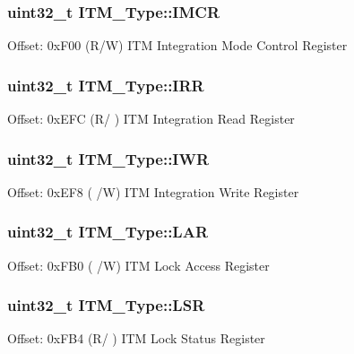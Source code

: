 \subsubsection[{\texorpdfstring{I\+M\+CR}{IMCR}}]{ uint32\+\_\+t I\+T\+M\+\_\+\+Type\+::\+I\+M\+CR}\hypertarget{structITM__Type_ab2e87d8bb0e3ce9b8e0e4a6a6695228a}{}\label{structITM__Type_ab2e87d8bb0e3ce9b8e0e4a6a6695228a}
Offset\+: 0x\+F00 (R/W) I\+TM Integration Mode Control Register 
\subsubsection[{\texorpdfstring{I\+RR}{IRR}}]{ uint32\+\_\+t I\+T\+M\+\_\+\+Type\+::\+I\+RR}\hypertarget{structITM__Type_a212a614a8d5f2595e5eb049e5143c739}{}\label{structITM__Type_a212a614a8d5f2595e5eb049e5143c739}
Offset\+: 0x\+E\+FC (R/ ) I\+TM Integration Read Register 
\subsubsection[{\texorpdfstring{I\+WR}{IWR}}]{ uint32\+\_\+t I\+T\+M\+\_\+\+Type\+::\+I\+WR}\hypertarget{structITM__Type_afd0e0c051acd3f6187794a4e8dc7e7ea}{}\label{structITM__Type_afd0e0c051acd3f6187794a4e8dc7e7ea}
Offset\+: 0x\+E\+F8 ( /W) I\+TM Integration Write Register 
\subsubsection[{\texorpdfstring{L\+AR}{LAR}}]{ uint32\+\_\+t I\+T\+M\+\_\+\+Type\+::\+L\+AR}\hypertarget{structITM__Type_a97840d39a9c63331e3689b5fa69175e9}{}\label{structITM__Type_a97840d39a9c63331e3689b5fa69175e9}
Offset\+: 0x\+F\+B0 ( /W) I\+TM Lock Access Register 
\subsubsection[{\texorpdfstring{L\+SR}{LSR}}]{ uint32\+\_\+t I\+T\+M\+\_\+\+Type\+::\+L\+SR}\hypertarget{structITM__Type_aaa0515b1f6dd5e7d90b61ef67d8de77b}{}\label{structITM__Type_aaa0515b1f6dd5e7d90b61ef67d8de77b}
Offset\+: 0x\+F\+B4 (R/ ) I\+TM Lock Status Register 
